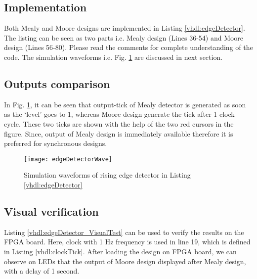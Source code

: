 %


\subsection{Implementation}
Both Mealy and Moore designs are implemented in Listing \ref{vhdl:edgeDetector}. The listing can be seen as two parts i.e. Mealy design (Lines 36-54) and Moore design (Lines 56-80). Please read the comments for complete understanding of the code. The simulation waveforms i.e. Fig. \ref{fig:edgeDetectorWave} are discussed in next section. 


\subsection{Outputs comparison}

In Fig. \ref{fig:edgeDetectorWave}, it can be seen that output-tick of Mealy detector is generated as soon as the `level' goes to 1, whereas Moore design generate the tick after 1 clock cycle. These two ticks are shown with the help of the two red cursors in the figure. Since, output of Mealy design is immediately available therefore it is preferred for synchronous designs. 

\begin{figure}[!h]
	\centering
	\texttt{[image: edgeDetectorWave]}
	\caption{Simulation waveforms of rising edge detector in Listing \ref{vhdl:edgeDetector}}
	\label{fig:edgeDetectorWave}
\end{figure}

\subsection{Visual verification}
Listing \ref{vhdl:edgeDetector_VisualTest} can be used to verify the results on the FPGA board. Here, clock with 1 Hz frequency is used in line 19, which is defined in Listing \ref{vhdl:clockTick}. After loading the design on FPGA board, we can observe on LEDs that the output of Moore design displayed after  Mealy design, with a delay of 1 second.  

